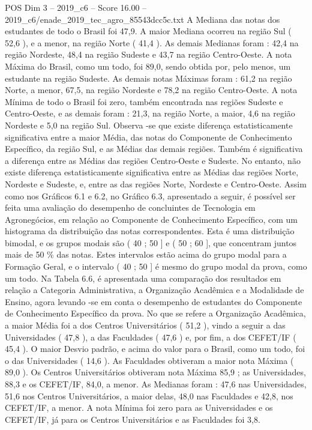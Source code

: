 \begin{textsample}{POS Dim 3 – 2019\_c6 – Score 16.00 – 2019\_c6/enade\_2019\_tec\_agro\_85543dcc5c.txt}
A Mediana das notas dos estudantes de todo o Brasil foi 47,9.
A maior Mediana ocorreu na região Sul ( 52,6 ), e a menor, na região Norte ( 41,4 ).
As demais Medianas foram : 42,4 na região Nordeste, 48,4 na região Sudeste e 43,7 na região Centro-Oeste.
A nota Máxima do Brasil, como um todo, foi 89,0, sendo obtida por, pelo menos, um estudante na região Sudeste.
As demais notas Máximas foram : 61,2 na região Norte, a menor, 67,5, na região Nordeste e 78,2 na região Centro-Oeste.
A nota Mínima de todo o Brasil foi zero, também encontrada nas regiões Sudeste e Centro-Oeste, e as demais foram : 21,3, na região Norte, a maior, 4,6 na região Nordeste e 5,0 na região Sul.
Observa -se que existe diferença estatisticamente significativa entre a maior Média, das notas do Componente de Conhecimento Específico, da região Sul, e as Médias das demais regiões.
Também é significativa a diferença entre as Médias das regiões Centro-Oeste e Sudeste.
No entanto, não existe diferença estatisticamente significativa entre as Médias das regiões Norte, Nordeste e Sudeste, e, entre as das regiões Norte, Nordeste e Centro-Oeste.
Assim como nos Gráficos 6.1 e 6.2, no Gráfico 6.3, apresentado a seguir, é possível ser feita uma avaliação do desempenho de concluintes de Tecnologia em Agronegócios, em relação ao Componente de Conhecimento Específico, com um histograma da distribuição das notas correspondentes.
Esta é uma distribuição bimodal, e os grupos modais são ( 40 ; 50 ] e ( 50 ; 60 ], que concentram juntos mais de 50 \% das notas.
Estes intervalos estão acima do grupo modal para a Formação Geral, e o intervalo ( 40 ; 50 ] é mesmo do grupo modal da prova, como um todo.
Na Tabela 6.6, é apresentada uma comparação dos resultados em relação a Categoria Administrativa, a Organização Acadêmica e a Modalidade de Ensino, agora levando -se em conta o desempenho de estudantes do Componente de Conhecimento Específico da prova.
No que se refere a Organização Acadêmica, a maior Média foi a dos Centros Universitários ( 51,2 ), vindo a seguir a das Universidades ( 47,8 ), a das Faculdades ( 47,6 ) e, por fim, a dos CEFET/IF ( 45,4 ).
O maior Desvio padrão, e acima do valor para o Brasil, como um todo, foi o das Universidades ( 14,6 ).
As Faculdades obtiveram a maior nota Máxima ( 89,0 ).
Os Centros Universitários obtiveram nota Máxima 85,9 ; as Universidades, 88,3 e os CEFET/IF, 84,0, a menor.
As Medianas foram : 47,6 nas Universidades, 51,6 nos Centros Universitários, a maior delas, 48,0 nas Faculdades e 42,8, nos CEFET/IF, a menor.
A nota Mínima foi zero para as Universidades e os CEFET/IF, já para os Centros Universitários e as Faculdades foi 3,8.

\end{textsample}
